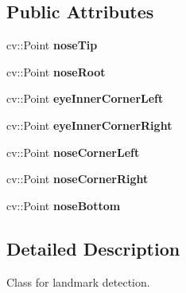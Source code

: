 \subsection*{Public Attributes}
\begin{DoxyCompactItemize}
\item 
\hypertarget{class_landmark_detector_a11f027af8a1ae3515d8371b7df1c2e88}{cv\+::\+Point {\bfseries nose\+Tip}}\label{class_landmark_detector_a11f027af8a1ae3515d8371b7df1c2e88}

\item 
\hypertarget{class_landmark_detector_a9cd890a65aad92f3a90aa2ea0c051a73}{cv\+::\+Point {\bfseries nose\+Root}}\label{class_landmark_detector_a9cd890a65aad92f3a90aa2ea0c051a73}

\item 
\hypertarget{class_landmark_detector_a63dea171e498afd5b1ea3d5561ec63bb}{cv\+::\+Point {\bfseries eye\+Inner\+Corner\+Left}}\label{class_landmark_detector_a63dea171e498afd5b1ea3d5561ec63bb}

\item 
\hypertarget{class_landmark_detector_ad8ddb3fce40489e398bc1dd055d3e936}{cv\+::\+Point {\bfseries eye\+Inner\+Corner\+Right}}\label{class_landmark_detector_ad8ddb3fce40489e398bc1dd055d3e936}

\item 
\hypertarget{class_landmark_detector_aabda0f65b4d054befd2115408c33420d}{cv\+::\+Point {\bfseries nose\+Corner\+Left}}\label{class_landmark_detector_aabda0f65b4d054befd2115408c33420d}

\item 
\hypertarget{class_landmark_detector_aba55847250b8ec56c64e085d90b42615}{cv\+::\+Point {\bfseries nose\+Corner\+Right}}\label{class_landmark_detector_aba55847250b8ec56c64e085d90b42615}

\item 
\hypertarget{class_landmark_detector_a523f207dd4d020c2a157c907a2172ec9}{cv\+::\+Point {\bfseries nose\+Bottom}}\label{class_landmark_detector_a523f207dd4d020c2a157c907a2172ec9}

\end{DoxyCompactItemize}


\subsection{Detailed Description}
Class for landmark detection. 

